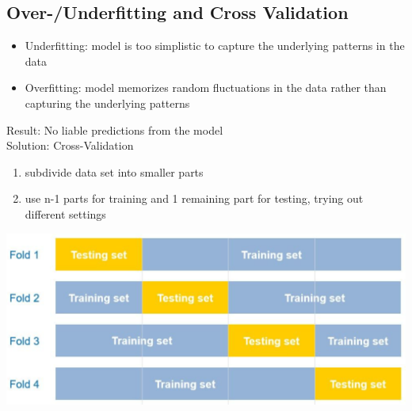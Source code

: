 \subsection{Over-/Underfitting and Cross Validation}
    \begin{itemize}
        \item Underfitting: model is too simplistic to capture the underlying patterns in the data
        \item Overfitting: model memorizes random fluctuations in the data rather than capturing the underlying patterns
    \end{itemize}
    Result: No liable predictions from the model\\
    Solution: Cross-Validation
    \begin{enumerate}
        \item subdivide data set into smaller parts
        \item use n-1 parts for training and 1 remaining part for testing, trying out different settings
    \end{enumerate}
    \includegraphics[width = \linewidth]{src/8_ml/images/cross_validation.png}